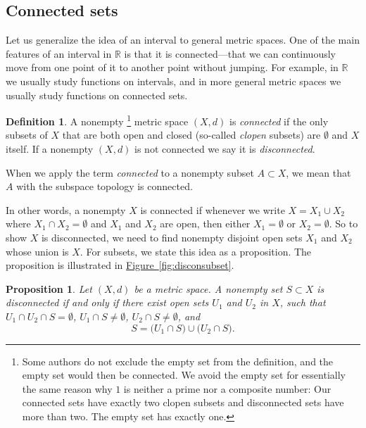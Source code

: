 \documentclass[12pt,openany]{book}
\newcommand{\R}{{\mathbb{R}}}
\newcommand{\myindex}[1]{#1\index{#1}}
\theoremstyle{plain}
\newtheorem{prop}[thm]{Proposition}
\theoremstyle{remark}
\theoremstyle{definition}
\newtheorem{defn}[thm]{Definition}
\theoremstyle{exercise}
\theoremstyle{example}
\newcommand{\figureref}[1]{\hyperref[#1]{Figure~\ref*{#1}}}
\begin{document}
\subsection{Connected sets}

Let us generalize the idea of an interval to general metric spaces.  One of
the main features of an interval in $\R$ is that it is
connected---that we can continuously move from one point of it to
another point without jumping.
For example, in $\R$ we usually study functions on intervals,
and in more general metric spaces we usually study functions on connected sets.

\begin{defn}
A nonempty%
\footnote{Some authors do not exclude the empty set from the definition,
and the empty set would then be connected.
We avoid the empty set for essentially the same reason why
$1$ is neither a prime nor a composite number:  Our connected sets have exactly
two clopen subsets and disconnected sets have more than two.  The empty set
has exactly one.}
metric space $(X,d)$ is \emph{\myindex{connected}} if the
only subsets of $X$ that are both open and closed (so-called
\emph{\myindex{clopen}} subsets) are $\emptyset$ and $X$ itself.
If a nonempty $(X,d)$ is not connected we say it is
\emph{\myindex{disconnected}}.

When we apply the term \emph{connected} to a nonempty subset $A \subset X$, we 
mean that $A$ with the subspace topology is connected.
\end{defn}

In other words, a nonempty $X$ is connected if whenever we write
$X = X_1 \cup X_2$ where $X_1 \cap X_2 = \emptyset$ and $X_1$ and $X_2$ are
open, then either $X_1 = \emptyset$ or $X_2 = \emptyset$.
So to show $X$ is disconnected, we need to find nonempty
disjoint open sets $X_1$ and
$X_2$ whose union is $X$.
For subsets, we state this idea as a proposition.
The proposition is illustrated in \figureref{fig:disconsubset}.

\begin{prop}
Let $(X,d)$ be a metric space.
A nonempty set $S \subset X$ is disconnected if and only if
there exist open sets $U_1$ and
$U_2$ in $X$, such that $U_1 \cap U_2 \cap S = \emptyset$,
$U_1 \cap S \not= \emptyset$,
$U_2 \cap S \not= \emptyset$, and
\begin{equation*}
S = 
\bigl( U_1 \cap S \bigr)
\cup
\bigl( U_2 \cap S \bigr) .
\end{equation*}
\end{prop}
\end{document}
